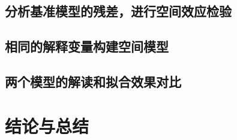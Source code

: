 \documentclass[UTF8]{ctexart}
\begin{document}
\subsection{分析基准模型的残差，进行空间效应检验}

\subsection{相同的解释变量构建空间模型}

\subsection{两个模型的解读和拟合效果对比}

\section{结论与总结}



\end{document}
